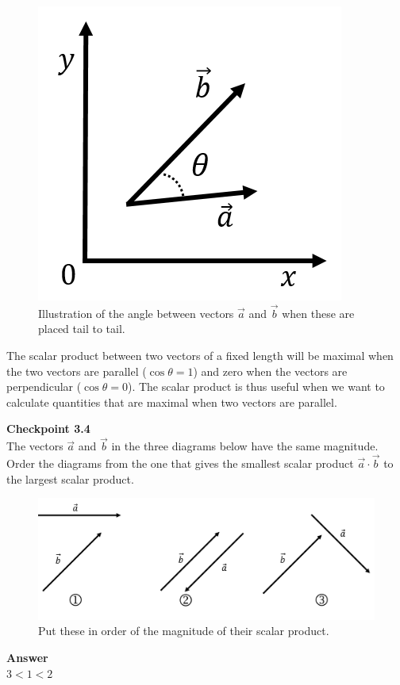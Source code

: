 \begin{figure}[!htbp]
\centering
\includegraphics[width=0.375\linewidth]{files/scalarproduct-76eac9ae093e2d1f0c79b032fc805048.png}
\caption[]{Illustration of the angle between vectors $\vec a$ and $\vec b$ when these are placed tail to tail.}
\label{fig:Vectors:scalarproduct}
\end{figure}

The scalar product between two vectors of a fixed length will be maximal when the two vectors are parallel ($\cos\theta=1$) and zero when the vectors are perpendicular ($\cos\theta =0$). The scalar product is thus useful when we want to calculate quantities that are maximal when two vectors are parallel.

\begin{framed}
\textbf{Checkpoint 3.4}\\
The vectors $\vec a$ and $\vec b$ in the three diagrams below have the same magnitude. Order the diagrams from the one that gives the smallest scalar product $\vec a\cdot \vec b$ to the largest scalar product.

\begin{figure}[!htbp]
\centering
\includegraphics[width=1\linewidth]{files/vectororder-853fd2d5b8f2fb40756bb18b5b6128a5.png}
\caption[]{Put these in order of the magnitude of their scalar product.}
\label{fig:Vectors:scalarproductorder}
\end{figure}

\begin{framed}
\textbf{Answer}\\
$3<1<2$
\end{framed}
\end{framed}

